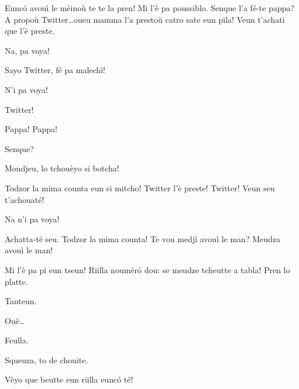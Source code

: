 \begin{drama}

\Alicespeaks Eunc\'o avouì le mèinoù te te la pren! Mi l'è pa poussiblo.  Senque l'a fé-te pappa? A propoù Twitter\ldots oueu mamma l'a prestoù catro sate eun pila! Veun t'achatì que l'è preste.

\Twitterspeaks Na, pa voya!

\Alicespeaks{} Sayo Twitter, fé pa malechì!

\Twitterspeaks N'i pa voya!

\Alicespeaks Twitter!

\Twitterspeaks Pappa! Pappa!

\Tanteunspeaks Senque?


\Tanteunspeaks{} Mondjeu, lo tchouèyo si botcha!

\Alicespeaks{} Todzor la mima counta eun si mitcho! Twitter l'è preste!  Twitter! Veun seu t'achouaté!

\Twitterspeaks Na n'i pa voya!


\Alicespeaks Achatta-té seu. Todzor la mima counta! Te vou medjì avouì le man? Meudza avouì le man!


\Tantaspeaks {} Mi l'è pa pi eun tseun! Riilla noumér\'o dou: se meudze tcheutte a tabla!  Pren lo platte.


\Tantaspeaks Tanteun.

\Tanteunspeaks{} Ouè\ldots

\Tantaspeaks{} Feulla.

\Tanteunspeaks{} Squeuza, to de chouite.


\Alicespeaks{} Vèyo que beutte eun riilla eunc\'o té!


\end{drama}
